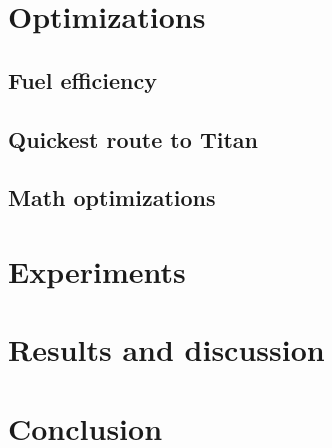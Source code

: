 \documentclass[10pt,a4paper]{article}
\begin{document}
	\section{Optimizations}
	\subsection{Fuel efficiency}
	\subsection{Quickest route to Titan}
	\subsection{Math optimizations}

	\section{Experiments}
	
	\section{Results and discussion}

	\section{Conclusion}
\end{document}
